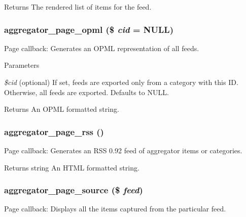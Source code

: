 \begin{DoxyReturn}{Returns}
The rendered list of items for the feed. 
\end{DoxyReturn}
\hypertarget{aggregator_8pages_8inc_a8d85211ae223530fc56bad7caf9a9b5d}{
\subsubsection[{aggregator\_\-page\_\-opml}]{\setlength{\rightskip}{0pt plus 5cm}aggregator\_\-page\_\-opml (\$ {\em cid} = {\ttfamily NULL})}}
\label{aggregator_8pages_8inc_a8d85211ae223530fc56bad7caf9a9b5d}
Page callback: Generates an OPML representation of all feeds.


\begin{DoxyParams}{Parameters}
\item[{\em \$cid}](optional) If set, feeds are exported only from a category with this ID. Otherwise, all feeds are exported. Defaults to NULL.\end{DoxyParams}
\begin{DoxyReturn}{Returns}
An OPML formatted string. 
\end{DoxyReturn}
\hypertarget{aggregator_8pages_8inc_a94deaf11e3e859a3c338a74191120a37}{
\subsubsection[{aggregator\_\-page\_\-rss}]{\setlength{\rightskip}{0pt plus 5cm}aggregator\_\-page\_\-rss ()}}
\label{aggregator_8pages_8inc_a94deaf11e3e859a3c338a74191120a37}
Page callback: Generates an RSS 0.92 feed of aggregator items or categories.

\begin{DoxyReturn}{Returns}
string An HTML formatted string. 
\end{DoxyReturn}
\hypertarget{aggregator_8pages_8inc_a86e3f4a4faec71de2d52a3c655b62757}{
\subsubsection[{aggregator\_\-page\_\-source}]{\setlength{\rightskip}{0pt plus 5cm}aggregator\_\-page\_\-source (\$ {\em feed})}}
\label{aggregator_8pages_8inc_a86e3f4a4faec71de2d52a3c655b62757}
Page callback: Displays all the items captured from the particular feed.


